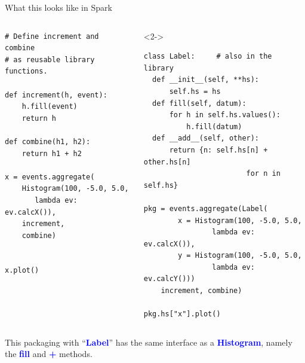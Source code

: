 \documentclass[aspectratio=169]{beamer}
\begin{document}
\begin{frame}[fragile]{What this looks like in Spark}
\begin{columns}
\small
\begin{verbatim}
# Define increment and combine
# as reusable library functions.

def increment(h, event):
    h.fill(event)
    return h

def combine(h1, h2):
    return h1 + h2

x = events.aggregate(
    Histogram(100, -5.0, 5.0,
       lambda ev: ev.calcX()),
    increment,
    combine)


x.plot()
\end{verbatim}

\begin{uncoverenv}<2->
\small
\begin{verbatim}
class Label:     # also in the library
  def __init__(self, **hs):
      self.hs = hs
  def fill(self, datum):
      for h in self.hs.values():
          h.fill(datum)
  def __add__(self, other):
      return {n: self.hs[n] + other.hs[n]
                        for n in self.hs}

pkg = events.aggregate(Label(
        x = Histogram(100, -5.0, 5.0,
                lambda ev: ev.calcX()),
        y = Histogram(100, -5.0, 5.0,
                lambda ev: ev.calcY()))
    increment, combine)

pkg.hs["x"].plot()
\end{verbatim}
\end{uncoverenv}
\end{columns}
\end{frame}

\begin{frame}{}
\begin{center}
\Large This packaging with ``\textcolor{blue}{\ttfamily \textbf{Label}}'' has the same interface as a \textcolor{blue}{\ttfamily \textbf{Histogram}}, namely the \textcolor{blue}{\ttfamily \textbf{fill}} and \textcolor{blue}{\ttfamily \textbf{+}} methods.
\end{center}
\end{frame}
\end{document}
